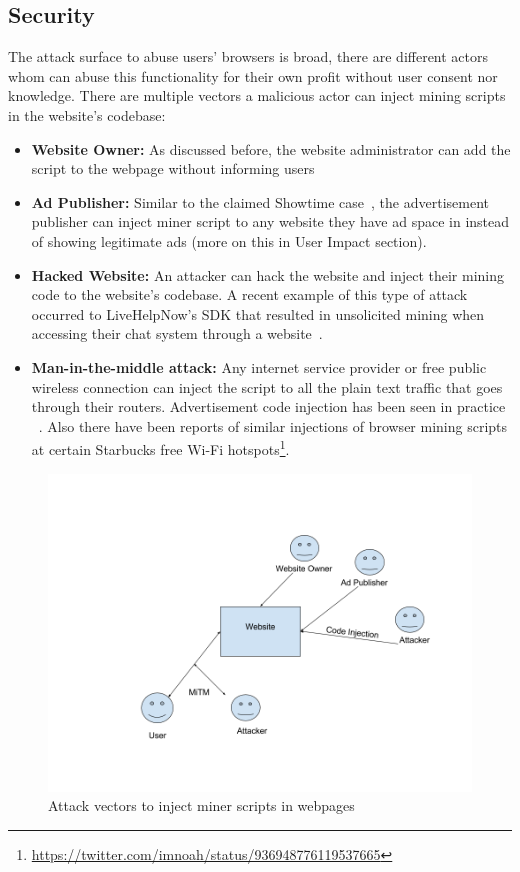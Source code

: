 \subsection{\textbf{Security}}
The attack surface to abuse users' browsers is broad, there are different actors whom can abuse this functionality for their own profit without user consent nor knowledge. There are multiple vectors a malicious actor can inject mining scripts in the website's codebase:
\begin{itemize}
\item \textbf{Website Owner:} As discussed before, the website administrator can add the script to the webpage without informing users
\item \textbf{Ad Publisher:} Similar to the claimed Showtime case~\cite{showtimehive}, the advertisement publisher can inject miner script to any website they have ad space in instead of showing legitimate ads (more on this in User Impact section).
\item \textbf{Hacked Website:} An attacker can hack the website and inject their mining code to the website's codebase. A recent example of this type of attack occurred to LiveHelpNow's SDK that resulted in unsolicited mining when accessing their chat system through a website~\cite{chatsupporthack}.
\item \textbf{Man-in-the-middle attack:} Any internet service provider or free public wireless connection can inject the script to all the plain text traffic that goes through their routers. Advertisement code injection has been seen in practice ~\cite{vergeadinjection}. Also there have been reports of similar injections of browser mining scripts at certain Starbucks free Wi-Fi hotspots\footnote{\url{https://twitter.com/imnoah/status/936948776119537665}}.
\end{itemize}


\begin{figure}[t]
\centering
\includegraphics[width=\linewidth]{figures/attack_vectors.png}
\caption{Attack vectors to inject miner scripts in webpages}
\end{figure}


